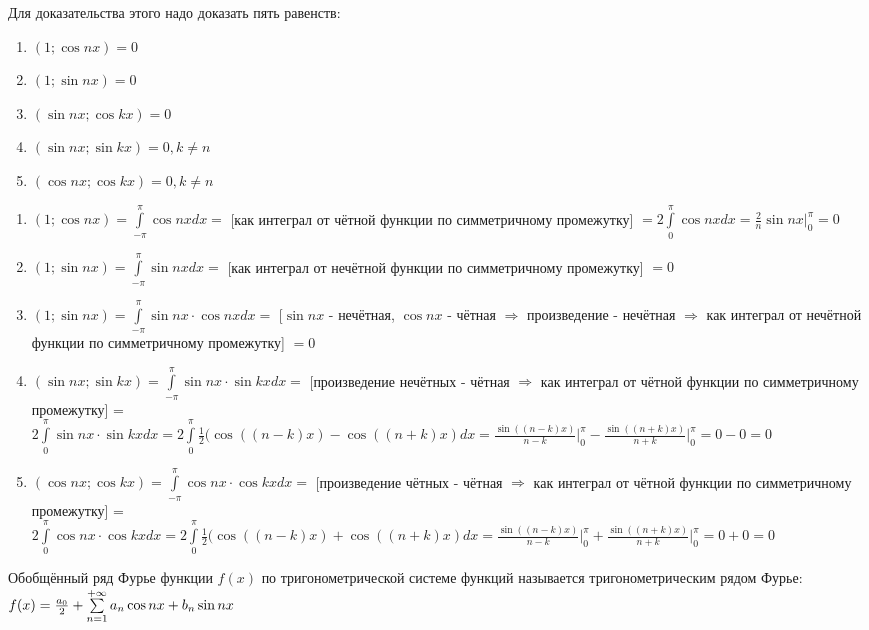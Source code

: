 \begin{Proof}
	Для доказательства этого надо доказать пять равенств:
	\begin{enumerate}
		\item $(1;\cos nx) = 0$
		\item $(1;\sin nx) = 0$
		\item $(\sin nx; \cos kx) = 0$
		\item $(\sin nx; \sin kx) = 0, k \neq n$
		\item $(\cos nx; \cos kx) = 0, k \neq n$
	\end{enumerate}

	\begin{enumerate}
		\item $(1; \cos nx) = \int\limits_{-\pi}^{\pi}\cos nx dx =$ [как интеграл от чётной функции по симметричному промежутку] $= 2\int\limits_{0}^{\pi}\cos nx dx = \frac{2}{n} \sin nx\big|_{0}^{\pi} = 0$
		\item $(1; \sin nx) = \int\limits_{-\pi}^{\pi}\sin nx dx =$ [как интеграл от нечётной функции по симметричному промежутку] $= 0$
		\item $(1; \sin nx) = \int\limits_{-\pi}^{\pi}\sin nx \cdot \cos nx dx =$ [$\sin nx$ - нечётная, $\cos nx$ - чётная $\Rightarrow$ произведение - нечётная $\Rightarrow$ как интеграл от нечётной функции по симметричному промежутку] $= 0$
		\item $(\sin nx; \sin kx) = \int\limits_{-\pi}^{\pi}\sin nx \cdot \sin kx dx =$ [произведение нечётных - чётная $\Rightarrow$ как интеграл от чётной функции по симметричному промежутку] = $2\int\limits_{0}^{\pi}\sin nx \cdot \sin kx dx = 2\int\limits_{0}^{\pi}\frac{1}{2}(\cos((n-k)x) - \cos((n+k)x)dx = \frac{\sin((n-k)x)}{n-k}\big|_{0}^{\pi} - \frac{\sin((n+k)x)}{n+k}\big|_{0}^{\pi} = 0 - 0 = 0$
		\item $(\cos nx; \cos kx) = \int\limits_{-\pi}^{\pi}\cos nx \cdot \cos kx dx =$ [произведение чётных - чётная $\Rightarrow$ как интеграл от чётной функции по симметричному промежутку] = $2\int\limits_{0}^{\pi}\cos nx \cdot \cos kx dx = 2\int\limits_{0}^{\pi}\frac{1}{2}(\cos((n-k)x) + \cos((n+k)x)dx = \frac{\sin((n-k)x)}{n-k}\big|_{0}^{\pi} + \frac{\sin((n+k)x)}{n+k}\big|_{0}^{\pi} = 0 + 0 = 0$
	\end{enumerate}
\end{Proof}

\begin{Def}
	Обобщённый ряд Фурье функции $f(x)$ по тригонометрической системе функций называется тригонометрическим рядом Фурье: $f(x) = \frac{a_0}{2} + \sum\limits_{n = 1}^{+\infty}{a_n\cos nx + b_n\sin nx}$
\end{Def}

